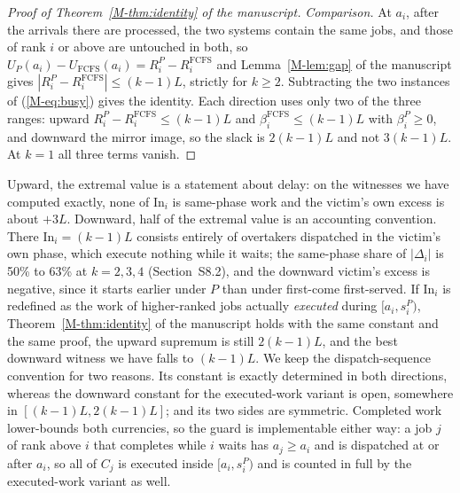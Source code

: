 \documentclass[mathematics,supfile,submit,moreauthors]{Definitions/mdpi}
\newcommand{\devnum}[1]{#1}
\begin{document}
\begin{proof}[Proof of Theorem~\ref*{M-thm:identity} of the manuscript]
\emph{Comparison.} At $a_i$, after the arrivals there are processed, the two
systems contain the same jobs, and those of rank $i$ or above are untouched in
both, so $U_P(a_i) - U_{\mathrm{FCFS}}(a_i) = R^P_i - R^{\mathrm{FCFS}}_i$ and
Lemma~\ref*{M-lem:gap} of the manuscript gives $|R^P_i - R^{\mathrm{FCFS}}_i| \le (k-1)L$, strictly
for $k \ge 2$. Subtracting
the two instances of (\ref*{M-eq:busy}) gives the identity. Each direction uses
only two of the three ranges: upward
$R^P_i - R^{\mathrm{FCFS}}_i \le (k-1)L$ and $\beta^{\mathrm{FCFS}}_i \le (k-1)L$
with $\beta^P_i \ge 0$, and downward the mirror image, so the slack is
$2(k-1)L$ and not $3(k-1)L$. At $k = 1$ all three terms vanish.
\end{proof}

\begin{remark}
\label{rem:directions}
Upward, the extremal value is a statement about delay: on the witnesses we have
computed exactly, none of $\mathrm{In}_i$ is same-phase work and the victim's own
excess is about $+3L$. Downward, half of the extremal value is an accounting
convention. There $\mathrm{In}_i = (k-1)L$ consists entirely of overtakers
dispatched in the victim's own phase, which execute nothing while it waits; the
same-phase share of $|\Delta_i|$ is \devnum{50\%} to \devnum{63\%} at
$k = 2, 3, 4$ (Section~S8.2), and the downward victim's excess is
negative, since it starts earlier under $P$ than under first-come first-served.
If $\mathrm{In}_i$ is redefined as the work of higher-ranked jobs actually
\emph{executed} during $[a_i, s^P_i)$, Theorem~\ref*{M-thm:identity} of the manuscript holds with the
same constant and the same proof, the upward supremum is still $2(k-1)L$, and
the best downward witness we have falls to $(k-1)L$. We keep the
dispatch-sequence convention for two reasons. Its constant is exactly determined
in both directions, whereas the downward constant for the executed-work variant
is open, somewhere in $[(k-1)L, 2(k-1)L]$; and its two sides are symmetric.
Completed work lower-bounds both currencies, so the guard is implementable
either way: a job $j$ of rank above $i$ that completes while $i$ waits has
$a_j \ge a_i$ and is dispatched at or after $a_i$, so all of $C_j$ is executed
inside $[a_i, s^P_i)$ and is counted in full by the executed-work variant as
well.
\end{remark}
\end{document}
